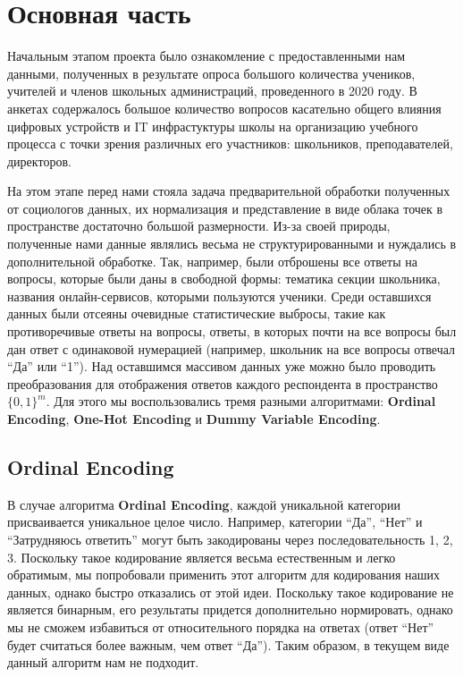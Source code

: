 \section{Основная часть}

Начальным этапом проекта было ознакомление с предоставленными нам данными, полученных в результате опроса большого количества учеников, учителей и членов школьных администраций, проведенного в 2020 году.
В анкетах содержалось большое количество вопросов касательно общего влияния цифровых устройств и IT инфрастуктуры школы на организацию учебного процесса с точки зрения различных его участников: школьников, преподавателей, директоров.

На этом этапе перед нами стояла задача предварительной обработки полученных от социологов данных, их нормализация и представление в виде облака точек в пространстве достаточно большой размерности.
Из-за своей природы, полученные нами данные являлись весьма не структурированными и нуждались в дополнительной обработке.
Так, например, были отброшены все ответы на вопросы, которые были даны в свободной формы: тематика секции школьника, названия онлайн-сервисов, которыми пользуются ученики.
Среди оставшихся данных были отсеяны очевидные статистические выбросы, такие как противоречивые ответы на вопросы, ответы, в которых почти на все вопросы был дан ответ с одинаковой нумерацией (например, школьник на все вопросы отвечал \enquote{Да} или \enquote{1}).
Над оставшимся массивом данных уже можно было проводить преобразования для отображения ответов каждого респондента в пространство $\{0, 1\}^{m}$.
Для этого мы воспользовались тремя разными алгоритмами: {\bf Ordinal Encoding}, {\bf One-Hot Encoding} и {\bf Dummy Variable Encoding}.

\subsection{Ordinal Encoding}

В случае алгоритма {\bf Ordinal Encoding}, каждой уникальной категории присваивается уникальное целое число.
Например, категории \enquote{Да}, \enquote{Нет} и \enquote{Затрудняюсь ответить} могут быть закодированы через последовательность 1, 2, 3.
Поскольку такое кодирование является весьма естественным и легко обратимым, мы попробовали применить этот алгоритм для кодирования наших данных, однако быстро отказались от этой идеи.
Поскольку такое кодирование не является бинарным, его результаты придется дополнительно нормировать, однако мы не сможем избавиться от относительного порядка на ответах (ответ \enquote{Нет} будет считаться более важным, чем ответ \enquote{Да}).
Таким образом, в текущем виде данный алгоритм нам не подходит.


